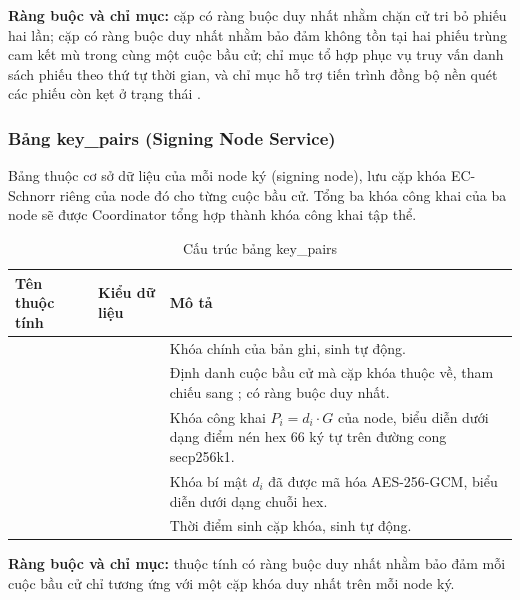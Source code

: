 \textbf{Ràng buộc và chỉ mục:} cặp  có ràng buộc duy nhất nhằm chặn cử tri bỏ phiếu hai lần; cặp  có ràng buộc duy nhất nhằm bảo đảm không tồn tại hai phiếu trùng cam kết mù trong cùng một cuộc bầu cử; chỉ mục tổ hợp  phục vụ truy vấn danh sách phiếu theo thứ tự thời gian, và chỉ mục  hỗ trợ tiến trình đồng bộ nền quét các phiếu còn kẹt ở trạng thái .

\subsubsection{Bảng {key\_pairs} (Signing Node Service)}

Bảng  thuộc cơ sở dữ liệu của mỗi node ký (signing node), lưu cặp khóa EC-Schnorr riêng của node đó cho từng cuộc bầu cử. Tổng ba khóa công khai của ba node sẽ được Coordinator tổng hợp thành khóa công khai tập thể.

\begin{table}[H]
    \centering
    \small
    \setlength{\tabcolsep}{3pt}
    \caption{Cấu trúc bảng {key\_pairs}}
    \label{tab:db-key-pairs}
    \begin{tabularx}{\textwidth}{|L{0.25}|L{0.25}|L{0.50}|}
    \hline
    \textbf{Tên thuộc tính} & \textbf{Kiểu dữ liệu} & \textbf{Mô tả} \\
    \hline
             &  & Khóa chính của bản ghi, sinh tự động. \\ \hline
     &  & Định danh cuộc bầu cử mà cặp khóa thuộc về, tham chiếu sang ; có ràng buộc duy nhất. \\ \hline
      &    & Khóa công khai $P_i = d_i \cdot G$ của node, biểu diễn dưới dạng điểm nén hex 66 ký tự trên đường cong secp256k1. \\ \hline
     &    & Khóa bí mật $d_i$ đã được mã hóa AES-256-GCM, biểu diễn dưới dạng chuỗi hex. \\ \hline
      &  & Thời điểm sinh cặp khóa, sinh tự động. \\ \hline
    \end{tabularx}
\end{table}

\textbf{Ràng buộc và chỉ mục:} thuộc tính  có ràng buộc duy nhất nhằm bảo đảm mỗi cuộc bầu cử chỉ tương ứng với một cặp khóa duy nhất trên mỗi node ký.

